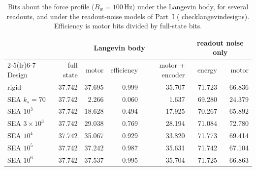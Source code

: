 \documentclass[11pt]{article}
\theoremstyle{definition}
\theoremstyle{remark}
\newcommand{\codeus}{\textunderscore\allowbreak}
\newcommand{\code}[1]{{\ttfamily\let\_\codeus\hyphenchar\font=-1 #1}}
\begin{document}
\begin{table}[t]\centering\small
\caption{Bits about the force profile ($B_w=100$\,Hz) under the Langevin body, for several
readouts, and under the readout-noise models of Part~I (\code{check\_langevin\_designs}).
Efficiency is motor bits divided by full-state bits.}
\label{tab:langevin}
\begin{tabular}{lrrrrrr}
\toprule
& \multicolumn{4}{c}{Langevin body} & \multicolumn{2}{c}{readout noise only}\\
\cmidrule(lr){2-5}\cmidrule(lr){6-7}
Design & full state & motor & efficiency & motor + encoder & energy & motor\\
\midrule
rigid            & 37.742 & 37.695 & 0.999 & 35.707 & 71.723 & 66.836\\
SEA $k_s=70$     & 37.742 &  2.266 & 0.060 &  1.637 & 69.280 & 24.379\\
SEA $10^3$       & 37.742 & 18.628 & 0.494 & 17.925 & 70.267 & 65.892\\
SEA $3\times10^3$& 37.742 & 29.038 & 0.769 & 28.194 & 71.084 & 72.780\\
SEA $10^4$       & 37.742 & 35.067 & 0.929 & 33.820 & 71.773 & 69.414\\
SEA $10^5$       & 37.742 & 37.242 & 0.987 & 35.631 & 71.742 & 67.104\\
SEA $10^6$       & 37.742 & 37.537 & 0.995 & 35.704 & 71.725 & 66.863\\
\bottomrule
\end{tabular}
\end{table}
\end{document}
